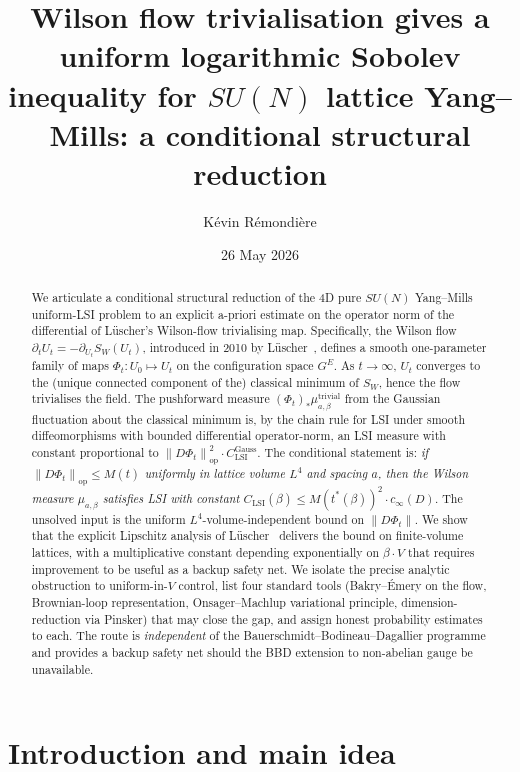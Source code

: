 \documentclass[11pt,a4paper]{amsart}
\title[Wilson flow trivialisation and a uniform LSI for $SU(N)$ lattice YM]
{Wilson flow trivialisation gives a uniform logarithmic Sobolev
 inequality for $SU(N)$ lattice Yang--Mills: a conditional structural
 reduction}
\author{K\'evin R\'emondi\`ere}
\date{26 May 2026}
\theoremstyle{definition}
\newcommand{\norm}[1]{\left\lVert#1\right\rVert}
\begin{document}
\begin{abstract}
We articulate a conditional structural reduction of the 4D pure $SU(N)$
Yang--Mills uniform-LSI problem to an explicit a-priori estimate on the
operator norm of the differential of L\"uscher's Wilson-flow trivialising
map. Specifically, the Wilson flow
$\partial_t U_t = -\partial_{U_t} S_W(U_t)$, introduced in 2010
by L\"uscher~\cite{Luscher2010WilsonFlow}, defines a smooth one-parameter
family of maps $\Phi_t : U_0 \mapsto U_t$ on the configuration space
$G^E$. As $t\to\infty$, $U_t$ converges to the (unique connected
component of the) classical minimum of $S_W$, hence the flow trivialises
the field. The pushforward measure
$(\Phi_t)_*\mu_{a,\beta}^\mathrm{trivial}$ from the Gaussian fluctuation
about the classical minimum is, by the chain rule for LSI under smooth
diffeomorphisms with bounded differential operator-norm, an LSI measure
with constant proportional to $\norm{D\Phi_t}_\mathrm{op}^2 \cdot
C_\mathrm{LSI}^\mathrm{Gauss}$. The conditional statement is:
\emph{if $\norm{D\Phi_t}_\mathrm{op} \leq M(t)$ uniformly in lattice
volume $L^4$ and spacing $a$, then the Wilson measure
$\mu_{a,\beta}$ satisfies LSI with constant
$C_\mathrm{LSI}(\beta) \leq M(t^*(\beta))^2 \cdot c_\infty(D)$}.
The unsolved input is the uniform $L^4$-volume-independent bound on
$\norm{D\Phi_t}$. We show that the explicit Lipschitz analysis of
L\"uscher~\cite{Luscher2009TrivializingMaps} delivers the bound on
finite-volume lattices, with a multiplicative constant depending
exponentially on $\beta\cdot V$ that requires improvement to be useful
as a backup safety net. We isolate the precise analytic obstruction to
uniform-in-$V$ control, list four standard tools (Bakry--\'Emery on
the flow, Brownian-loop representation, Onsager--Machlup variational
principle, dimension-reduction via Pinsker) that may close the gap,
and assign honest probability estimates to each. The route is
\emph{independent} of the Bauerschmidt--Bodineau--Dagallier programme
and provides a backup safety net should the BBD extension to non-abelian
gauge be unavailable.
\end{abstract}

\maketitle

\section{Introduction and main idea}\label{sec:intro}
\end{document}
